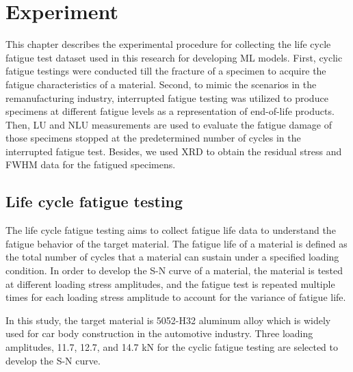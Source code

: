\chapter{Experiment}
\label{chap: exper}
This chapter describes the experimental procedure for collecting the life cycle fatigue test dataset used in this research for developing ML models. First, cyclic fatigue testings were conducted till the fracture of a specimen to acquire the fatigue characteristics of a material. Second, to mimic the scenarios in the remanufacturing industry, interrupted fatigue testing was utilized to produce specimens at different fatigue levels as a representation of end-of-life products. Then, LU and NLU measurements are used to evaluate the fatigue damage of those specimens stopped at the predetermined number of cycles in the interrupted fatigue test. Besides, we used XRD to obtain the residual stress and FWHM data for the fatigued specimens.

\section{Life cycle fatigue testing}
The life cycle fatigue testing aims to collect fatigue life data to understand the fatigue behavior of the target material. The fatigue life of a material is defined as the total number of cycles that a material can sustain under a specified loading condition. In order to develop the S-N curve of a material, the material is tested at different loading stress amplitudes, and the fatigue test is repeated multiple times for each loading stress amplitude to account for the variance of fatigue life.

In this study, the target material is 5052-H32 aluminum alloy which is widely used for car body construction in the automotive industry. 
Three loading amplitudes, 11.7, 12.7, and 14.7 kN for the cyclic fatigue testing are selected to develop the S-N curve.



